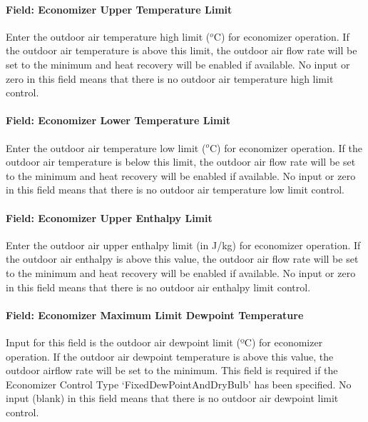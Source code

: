 \paragraph{Field: Economizer Upper Temperature Limit}\label{field-economizer-upper-temperature-limit-2}

Enter the outdoor air temperature high limit (\(^{o}\)C) for economizer operation. If the outdoor air temperature is above this limit, the outdoor air flow rate will be set to the minimum and heat recovery will be enabled if available. No input or zero in this field means that there is no outdoor air temperature high limit control.

\paragraph{Field: Economizer Lower Temperature Limit}\label{field-economizer-lower-temperature-limit-2}

Enter the outdoor air temperature low limit (\(^{o}\)C) for economizer operation. If the outdoor air temperature is below this limit, the outdoor air flow rate will be set to the minimum and heat recovery will be enabled if available. No input or zero in this field means that there is no outdoor air temperature low limit control.

\paragraph{Field: Economizer Upper Enthalpy Limit}\label{field-economizer-upper-enthalpy-limit-2}

Enter the outdoor air upper enthalpy limit (in J/kg) for economizer operation. If the outdoor air enthalpy is above this value, the outdoor air flow rate will be set to the minimum and heat recovery will be enabled if available. No input or zero in this field means that there is no outdoor air enthalpy limit control.

\paragraph{Field: Economizer Maximum Limit Dewpoint Temperature}\label{field-economizer-maximum-limit-dewpoint-temperature-5}

Input for this field is the outdoor air dewpoint limit (ºC) for economizer operation. If the outdoor air dewpoint temperature is above this value, the outdoor airflow rate will be set to the minimum. This field is required if the Economizer Control Type `FixedDewPointAndDryBulb' has been specified. No input (blank) in this field means that there is no outdoor air dewpoint limit control.

